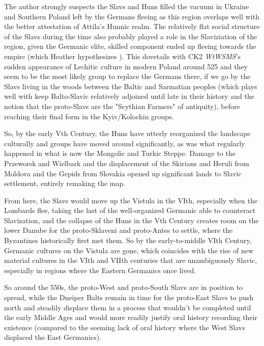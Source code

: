 \documentclass{article}
\newcommand{\wtwsms}{\textit{WtWSMS}}
\begin{document}
	The author strongly suspects the Slavs and Huns filled the vacuum in Ukraine and Southern Poland left by the Germans fleeing as this region overlaps well with the better attestation of Attila’s Hunnic realm.
	The relatively flat social structure of the Slavs during the time also probably played a role in the Slaviziation of the region, given the Germanic elite, skilled component ended up fleeing towards the empire (which Heather hypothesizes \cite{HeatherEmpiresAndBarbarians}).
	This dovetails with CK2 \wtwsms’s sudden appearance of Lechitic culture in modern Poland around 525 and they seem to be the most likely group to replace the Germans there, if we go by the Slavs living in the woods between the Baltic and Sarmatian peoples (which plays well with keep Balto-Slavic relatively adjoined until late in their history and the notion that the proto-Slavs are the "Scythian Farmers" of antiquity), before reaching their final form in the Kyiv/Kolochin groups.
	
	So, by the early Vth Century, the Huns have utterly reorganized the landscape culturally and groups have moved around significantly, as was what regularly happened in what is now the Mongolic and Turkic Steppe.
	Damage to the Przeworsk and Wielbark and the displacement of the Skirians and Heruli from Moldova and the Gepids from Slovakia opened up significant lands to Slavic settlement, entirely remaking the map.
	
	From here, the Slavs would move up the Vistula in the VIth, especially when the Lombards flee, taking the last of the well-organized Germanic able to counteract Slavization, and the collapse of the Huns in the Vth Century creates room on the lower Danube for the proto-Sklaveni and proto-Antes to settle, where the Byzantines historically first met them.
	So by the early-to-middle VIth Century, Germanic cultures on the Vistula are gone, which coincides with the rise of new material cultures in the VIth and VIIth centuries that are unambiguously Slavic, especially in regions where the Eastern Germanics once lived.
	
	So around the 550s, the proto-West and proto-South Slavs are in position to spread, while the Dneiper Balts remain in time for the proto-East Slavs to push north and steadily displace them in a process that wouldn’t be completed until the early Middle Ages \cite{EmergenceOfRussia} and would more readily justify oral history recording their existence (compared to the seeming lack of oral history where the West Slavs displaced the East Germanics).
	
\end{document}
